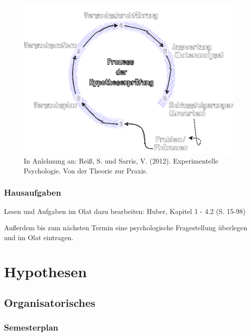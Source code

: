 \documentclass[
]{book}
\begin{document}
\begin{figure}

{\centering \includegraphics[width=450pt]{imgs/Hypothesen} 

}

\caption{In Anlehnung an: Reiß, S. und Sarris, V. (2012). Experimentelle Psychologie. Von der Theorie zur Praxis.}\label{fig:unnamed-chunk-18}
\end{figure}

\hypertarget{hausaufgaben}{%
\subsection{Hausaufgaben}\label{hausaufgaben}}

Lesen und Aufgaben im Olat dazu bearbeiten: Huber, Kapitel 1 - 4.2 (S. 15-98)

Außerdem bis zum nächsten Termin eine psychologische Fragestellung überlegen und im Olat eintragen.

\hypertarget{hypothesen}{%
\chapter{Hypothesen}\label{hypothesen}}

\hypertarget{organisatorisches-1}{%
\section{Organisatorisches}\label{organisatorisches-1}}

\hypertarget{semesterplan-2}{%
\subsection{Semesterplan}\label{semesterplan-2}}
\end{document}
